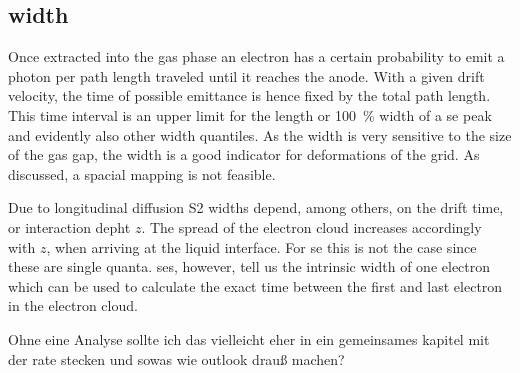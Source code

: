 
\FloatBarrier
\subsection{width}
\label{ssec:width}
\FloatBarrier


Once extracted into the gas phase an electron has a certain probability to emit a photon per path length traveled until it reaches the anode. %
With a given drift velocity, the time of possible emittance is hence fixed by the total path length.
This time interval is an upper limit for the length or \SI{100}{\%} width of a \gls{se} peak and evidently also other width quantiles.
As the width is very sensitive to the size of the gas gap, the width is a good indicator for deformations of the grid.
As discussed, a spacial mapping is not feasible.

Due to longitudinal diffusion S2 widths depend, among others, on the drift time, or interaction depht $ z $.
The spread of the electron cloud increases accordingly with $ z $, when arriving at the liquid interface.
For \gls{se} this is not the case since these are single quanta.
\glspl{se}, however, tell us the intrinsic width of one electron which can be used to calculate the exact time between the first and last electron in the electron cloud.


Ohne eine Analyse sollte ich das vielleicht eher in ein gemeinsames kapitel mit der rate stecken und sowas wie outlook drauß machen?










